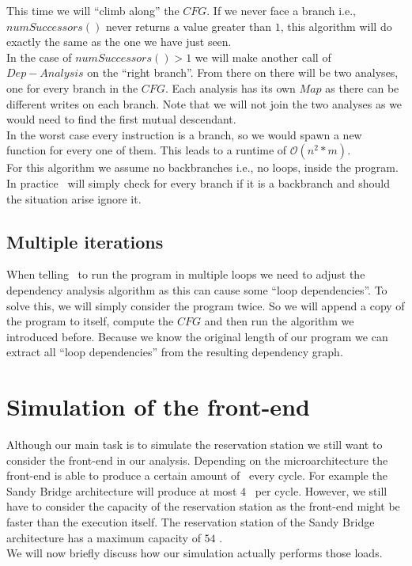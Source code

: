 This time we will ``climb along'' the $CFG$. If we never face a branch i.e., $numSuccessors()$ never returns a value greater than $1$, this algorithm will do exactly the same as the one we have just seen.\\
In the case of $numSuccessors() > 1$ we will make another call of $Dep-Analysis$ on the ``right branch''. From there on there will be two analyses, one for every branch in the $CFG$. Each analysis has its own $Map$ as there can be different writes on each branch. Note that we will not join the two analyses as we would need to find the first mutual descendant.\\
In the worst case every instruction is a branch, so we would spawn a new function for every one of them. This leads to a runtime of $\mathcal{O}(n^2*m)$.\\
For this algorithm we assume no backbranches i.e., no loops, inside the program. In practice \suaca\ will simply check for every branch if it is a backbranch and should the situation arise ignore it.


\subsection{Multiple iterations}

When telling \suaca\ to run the program in multiple loops we need to adjust the dependency analysis algorithm as this can cause some ``loop dependencies''. To solve this, we will simply consider the program twice. So we will append a copy of the program to itself, compute the $CFG$ and then run the algorithm we introduced before. Because we know the original length of our program we can extract all ``loop dependencies'' from the resulting dependency graph.


\section{Simulation of the front-end}
\label{sec:simfrontend}

Although our main task is to simulate the reservation station we still want to consider the front-end in our analysis. Depending on the microarchitecture the front-end is able to produce a certain amount of \microops\ every cycle. For example the Sandy Bridge architecture will produce at most $4$ \microops\ per cycle. However, we still have to consider the capacity of the reservation station as the front-end might be faster than the execution itself. The reservation station of the Sandy Bridge architecture has a maximum capacity of $54$ \microops.\\
We will now briefly discuss how our simulation actually performs those loads.\newpage


